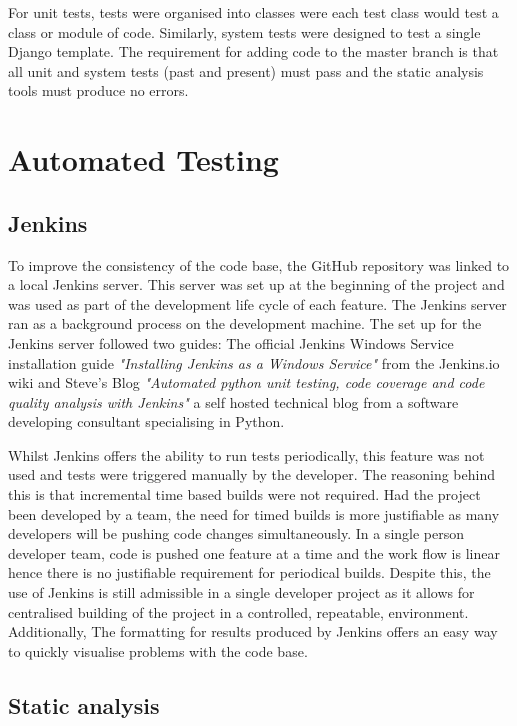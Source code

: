 For unit tests, tests were organised into classes were each test class would test a class or module of code. Similarly, system tests were designed to test a single Django template. The requirement for adding code to the master branch is that all unit and system tests (past and present) must pass and the static analysis tools must produce no errors.

\section{Automated Testing}
\subsection{Jenkins}
To improve the consistency of the code base, the GitHub repository was linked to a local Jenkins server. This server was set up at the beginning of the project and was used as part of the development life cycle of each feature. The Jenkins server ran as a background process on the development machine. The set up for the Jenkins server followed two guides: The official Jenkins Windows Service installation guide \textit{"Installing Jenkins as a Windows Service"} \cite{jenkins_wiki_install} from the Jenkins.io wiki and Steve's Blog \textit{"Automated python unit testing, code coverage and code quality analysis with Jenkins"} \cite{steves_blog} a self hosted technical blog from a software developing consultant specialising in Python.

Whilst Jenkins offers the ability to run tests periodically, this feature was not used and tests were triggered manually by the developer. The reasoning behind this is that incremental time based builds were not required. Had the project been developed by a team, the need for timed builds is more justifiable as many developers will be pushing code changes simultaneously. In a single person developer team, code is pushed one feature at a time and the work flow is linear hence there is no justifiable requirement for periodical builds. Despite this, the use of Jenkins is still admissible in a single developer project as it allows for centralised building of the project in a controlled, repeatable, environment. Additionally, The formatting for results produced by Jenkins offers an easy way to quickly visualise problems with the code base.

\subsection{Static analysis}
